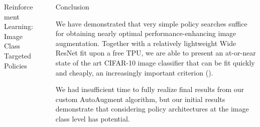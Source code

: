 \documentclass[final]{beamer}
\newlength{\sepwid}
\newlength{\onecolwid}
\begin{document}
\begin{frame}[t]
\begin{columns}[t]
\begin{column}{\onecolwid}
\begin{block}{Reinforcement Learning: Image Class Targeted Policies}
\end{block}










\end{column} %

\begin{column}{\sepwid}\end{column} %
\begin{column}{\onecolwid} %

\begin{block}{Conclusion}
		
  We have demonstrated that very simple policy searches suffice for obtaining nearly optimal performance-enhancing image augmentation. Together with a relatively lightweight Wide ResNet fit upon a free TPU, we are able to present an at-or-near state of the art CIFAR-10 image classifier that can be fit quickly and cheaply, an increasingly important criterion (\cite{Coleman2017}).
  
  We had insufficient time to fully realize final results from our custom AutoAugment algorithm, but our initial results demonstrate that considering policy architectures at the image class level has potential. 
  
  
\end{block}


\end{column}
\end{columns}
\end{frame}
\end{document}

